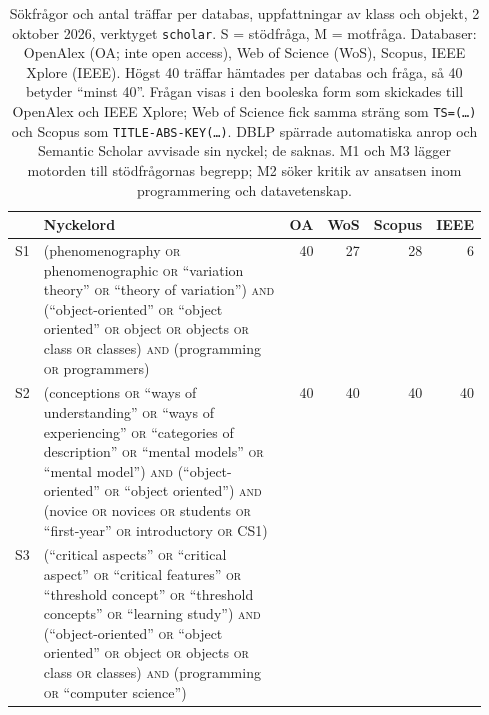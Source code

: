 \begin{table}[!htb]
  \centering
  \caption{Sökfrågor och antal träffar per databas,
    uppfattningar av klass och objekt, 2 oktober 2026, verktyget
    \texttt{scholar}.  S = stödfråga, M = motfråga.  Databaser: OpenAlex
    (OA; inte \foreignlanguage{english}{open access}), Web of Science
    (WoS), Scopus, IEEE Xplore (IEEE).  Högst 40 träffar hämtades per
    databas och fråga, så 40 betyder \enquote{minst 40}.  Frågan visas i
    den booleska form som skickades till OpenAlex och IEEE Xplore; Web of
    Science fick samma sträng som \texttt{TS=(\dots)} och Scopus som
    \texttt{TITLE-ABS-KEY(\dots)}.  DBLP spärrade automatiska anrop och
    Semantic Scholar avvisade sin nyckel; de saknas.  M1 och M3 lägger
    motorden till stödfrågornas begrepp; M2 söker kritik av ansatsen
    inom programmering och datavetenskap.}
  \label{tab:sok-queries-fen}
  \footnotesize
    \begin{tabular}{@{}lp{0.55\linewidth}rrrr@{}}
      \toprule
      & Nyckelord & OA & WoS & Scopus & IEEE \\
      \midrule
      S1 & (phenomenography \textsc{or} phenomenographic \textsc{or} \enquote{variation theory} \textsc{or} \enquote{theory of variation}) \textsc{and} (\enquote{object-oriented} \textsc{or} \enquote{object oriented} \textsc{or} object \textsc{or} objects \textsc{or} class \textsc{or} classes) \textsc{and} (programming \textsc{or} programmers)
         & 40 & 27 & 28 & 6 \\
      S2 & (conceptions \textsc{or} \enquote{ways of understanding} \textsc{or} \enquote{ways of experiencing} \textsc{or} \enquote{categories of description} \textsc{or} \enquote{mental models} \textsc{or} \enquote{mental model}) \textsc{and} (\enquote{object-oriented} \textsc{or} \enquote{object oriented}) \textsc{and} (novice \textsc{or} novices \textsc{or} students \textsc{or} \enquote{first-year} \textsc{or} introductory \textsc{or} CS1)
         & 40 & 40 & 40 & 40 \\
      S3 & (\enquote{critical aspects} \textsc{or} \enquote{critical aspect} \textsc{or} \enquote{critical features} \textsc{or} \enquote{threshold concept} \textsc{or} \enquote{threshold concepts} \textsc{or} \enquote{learning study}) \textsc{and} (\enquote{object-oriented} \textsc{or} \enquote{object oriented} \textsc{or} object \textsc{or} objects \textsc{or} class \textsc{or} classes) \textsc{and} (programming \textsc{or} \enquote{computer science})

\end{tabular}
\end{table}
